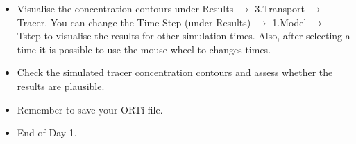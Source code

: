 \begin{itemize}
\item Visualise the concentration contours under {\color{blue}Results} $\rightarrow$ {\color{blue}3.Transport} $\rightarrow$ {\color{blue}Tracer}. You can change the {\color{blue}Time Step} (under Results) $\rightarrow$ {\color{blue}1.Model} $\rightarrow$ {\color{blue}Tstep} to visualise the results for other simulation times. Also, after selecting a time it is possible to use the mouse wheel to changes times. 

\item Check the simulated tracer concentration contours and assess whether the results are plausible.

\item Remember to save your ORTi file.

\item End of Day 1.

\end{itemize}


